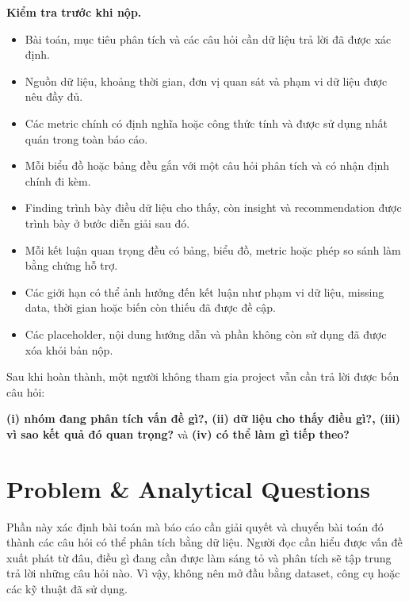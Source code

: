 \documentclass[12pt]{eDA_conquer2026}
\begin{document}
\textbf{Kiểm tra trước khi nộp.}
\begin{itemize}[label=$\square$, leftmargin=1.6em, itemsep=0.25em]
    \item Bài toán, mục tiêu phân tích và các câu hỏi cần dữ liệu trả lời đã được xác định.
    
    \item Nguồn dữ liệu, khoảng thời gian, đơn vị quan sát và phạm vi dữ liệu được nêu đầy đủ.
    
    \item Các metric chính có định nghĩa hoặc công thức tính và được sử dụng nhất quán trong toàn báo cáo.
    
    \item Mỗi biểu đồ hoặc bảng đều gắn với một câu hỏi phân tích và có nhận định chính đi kèm.
    
    \item Finding trình bày điều dữ liệu cho thấy, còn insight và recommendation được trình bày ở bước diễn giải sau đó.
    
    \item Mỗi kết luận quan trọng đều có bảng, biểu đồ, metric hoặc phép so sánh làm bằng chứng hỗ trợ.
    
    \item Các giới hạn có thể ảnh hưởng đến kết luận như phạm vi dữ liệu, missing data, thời gian hoặc biến còn thiếu đã được đề cập.
    
    \item Các placeholder, nội dung hướng dẫn và phần không còn sử dụng đã được xóa khỏi bản nộp.
\end{itemize}

Sau khi hoàn thành, một người không tham gia project vẫn cần trả lời được bốn câu hỏi: 

\textbf{(i) nhóm đang phân tích vấn đề gì?, (ii) dữ liệu cho thấy điều gì?, (iii) vì sao kết quả đó quan trọng?} và \textbf{(iv) có thể làm gì tiếp theo?}

\newpage

\section{Problem \& Analytical Questions}

Phần này xác định bài toán mà báo cáo cần giải quyết và chuyển bài toán đó thành các câu hỏi có thể phân tích bằng dữ liệu. Người đọc cần hiểu được vấn đề xuất phát từ đâu, điều gì đang cần được làm sáng tỏ và phân tích sẽ tập trung trả lời những câu hỏi nào. Vì vậy, không nên mở đầu bằng dataset, công cụ hoặc các kỹ thuật đã sử dụng.
\end{document}
